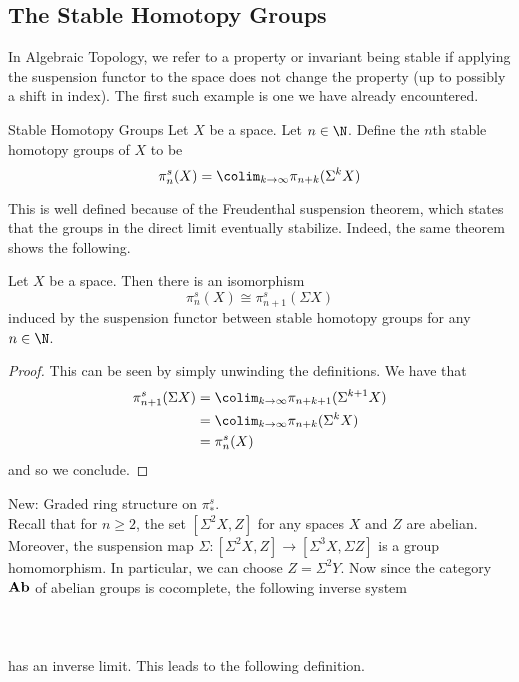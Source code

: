\documentclass[a4paper]{article}
\begin{document}
\subsection{The Stable Homotopy Groups}
In Algebraic Topology, we refer to a property or invariant being stable if applying the suspension functor to the space does not change the property (up to possibly a shift in index). The first such example is one we have already encountered. 

\begin{defn}{Stable Homotopy Groups}{} Let $X$ be a space. Let $n\in\N$. Define the $n$th stable homotopy groups of $X$ to be $$\pi_n^s(X)=\colim_{k\to\infty}\pi_{n+k}(\Sigma^kX)$$
\end{defn}

This is well defined because of the Freudenthal suspension theorem, which states that the groups in the direct limit eventually stabilize. Indeed, the same theorem shows the following. 

\begin{prp}{}{} Let $X$ be a space. Then there is an isomorphism $$\pi_n^s(X)\cong\pi_{n+1}^s(\Sigma X)$$ induced by the suspension functor between stable homotopy groups for any $n\in\N$. \tcbline
\begin{proof}
This can be seen by simply unwinding the definitions. We have that 
\begin{align*}
\pi_{n+1}^s(\Sigma X)&=\colim_{k\to\infty}\pi_{n+k+1}(\Sigma^{k+1}X)\\
&=\colim_{k\to\infty}\pi_{n+k}(\Sigma^kX)\\
&=\pi_n^s(X)
\end{align*}
and so we conclude. 
\end{proof}
\end{prp}

New: Graded ring structure on $\pi_\ast^s$. \\

Recall that for $n\geq 2$, the set $[\Sigma^2X,Z]$ for any spaces $X$ and $Z$ are abelian. Moreover, the suspension map $\Sigma:[\Sigma^2X,Z]\to[\Sigma^3X,\Sigma Z]$ is a group homomorphism. In particular, we can choose $Z=\Sigma^2Y$. Now since the category $\bold{Ab}$ of abelian groups is cocomplete, the following inverse system \\~\\
\\~\\
has an inverse limit. This leads to the following definition. 
\end{document}
